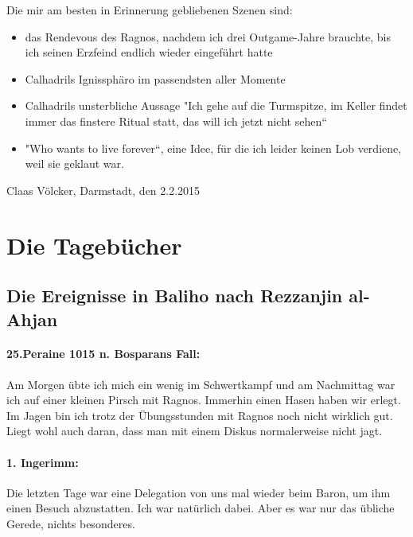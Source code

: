 \documentclass[11pt]{scrreprt}
\begin{document}
Die mir am besten in Erinnerung gebliebenen Szenen sind:
\begin{itemize}
\item das Rendevous des Ragnos, nachdem ich drei Outgame-Jahre brauchte, bis ich seinen Erzfeind endlich wieder eingeführt hatte
\item Calhadrils Ignissphäro im passendsten aller Momente
\item Calhadrils unsterbliche Aussage "Ich gehe auf die Turmspitze, im Keller findet immer das finstere Ritual statt, das will ich jetzt nicht sehen“
\item "Who wants to live forever“, eine Idee, für die ich leider keinen Lob verdiene, weil sie geklaut war.
\end{itemize}


\begin{flushright}
Claas Völcker, Darmstadt, den 2.2.2015
\end{flushright}


\section{Die Tagebücher}


\subsection{Die Ereignisse in Baliho nach Rezzanjin al-Ahjan}

\paragraph{25.Peraine 1015 n. Bosparans Fall:} Am Morgen übte ich mich ein wenig im Schwertkampf und am Nachmittag war ich auf einer kleinen Pirsch mit Ragnos. Immerhin einen Hasen haben wir erlegt. Im Jagen bin ich trotz der Übungsstunden mit Ragnos noch nicht wirklich gut. Liegt wohl auch daran, dass man mit einem Diskus normalerweise nicht jagt.

\paragraph{1. Ingerimm:} Die letzten Tage war eine Delegation von uns mal wieder beim Baron, um ihm einen Besuch abzustatten. Ich war natürlich dabei. Aber es war nur das übliche Gerede, nichts besonderes.
\end{document}
